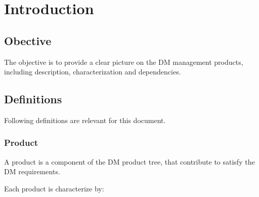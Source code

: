 \section{Introduction}


\subsection{Obective}

The objective is to provide a clear picture on the DM management products, including description, characterization and dependencies.


\subsection{Definitions}

Following definitions are relevant for this document.


\subsubsection{Product} \label{sec:product}

A product is a component of the DM product tree, that contribute to satisfy the DM requirements.

Each product is characterize by:

